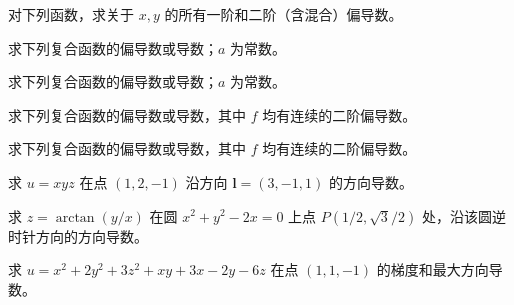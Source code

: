 \newpage
\noindent\begin{minipage}{\textwidth}
对下列函数，求关于 $x,y$ 的所有一阶和二阶（含混合）偏导数。
\end{minipage}\par\vfill
\noindent\begin{minipage}{\textwidth}
求下列复合函数的偏导数或导数；$a$ 为常数。
\end{minipage}\par\vfill
\noindent\begin{minipage}{\textwidth}
求下列复合函数的偏导数或导数；$a$ 为常数。
\end{minipage}\par\vfill
\noindent\begin{minipage}{\textwidth}
求下列复合函数的偏导数或导数，其中 $f$ 均有连续的二阶偏导数。
\end{minipage}\par\vfill
\newpage
\noindent\begin{minipage}{\textwidth}
求下列复合函数的偏导数或导数，其中 $f$ 均有连续的二阶偏导数。
\end{minipage}\par\vfill
\noindent\begin{minipage}{\textwidth}
求 $u=xyz$ 在点 $(1,2,-1)$ 沿方向 $\boldsymbol l=(3,-1,1)$ 的方向导数。
\end{minipage}\par\vfill
\noindent\begin{minipage}{\textwidth}
求 $z=\arctan(y/x)$ 在圆 $x^2+y^2-2x=0$ 上点 $P(1/2,\sqrt3/2)$ 处，沿该圆逆时针方向的方向导数。
\end{minipage}\par\vfill
\noindent\begin{minipage}{\textwidth}
求 $u=x^2+2y^2+3z^2+xy+3x-2y-6z$ 在点 $(1,1,-1)$ 的梯度和最大方向导数。
\end{minipage}\par\vfill
